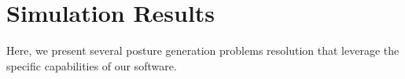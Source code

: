 





\section{Simulation Results}
\label{sec:4}
Here, we present several posture generation problems resolution that leverage the specific capabilities of our software.

